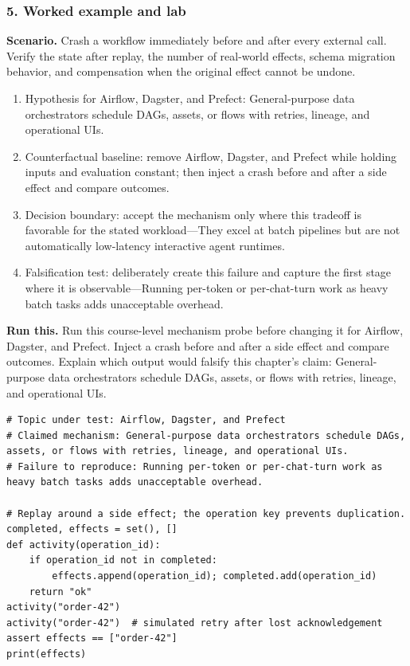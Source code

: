 \subsubsection*{5. Worked example and lab}
\textbf{Scenario.} Crash a workflow immediately before and after every external call. Verify the state after replay, the number of real-world effects, schema migration behavior, and compensation when the original effect cannot be undone.
\begin{enumerate}
\item Hypothesis for Airflow, Dagster, and Prefect: General-purpose data orchestrators schedule DAGs, assets, or flows with retries, lineage, and operational UIs.
\item Counterfactual baseline: remove Airflow, Dagster, and Prefect while holding inputs and evaluation constant; then inject a crash before and after a side effect and compare outcomes.
\item Decision boundary: accept the mechanism only where this tradeoff is favorable for the stated workload—They excel at batch pipelines but are not automatically low-latency interactive agent runtimes.
\item Falsification test: deliberately create this failure and capture the first stage where it is observable—Running per-token or per-chat-turn work as heavy batch tasks adds unacceptable overhead.
\end{enumerate}
\textbf{Run this.} Run this course-level mechanism probe before changing it for Airflow, Dagster, and Prefect. Inject a crash before and after a side effect and compare outcomes. Explain which output would falsify this chapter's claim: General-purpose data orchestrators schedule DAGs, assets, or flows with retries, lineage, and operational UIs.
\begin{Verbatim}[fontsize=\scriptsize]
# Topic under test: Airflow, Dagster, and Prefect
# Claimed mechanism: General-purpose data orchestrators schedule DAGs, assets, or flows with retries, lineage, and operational UIs.
# Failure to reproduce: Running per-token or per-chat-turn work as heavy batch tasks adds unacceptable overhead.

# Replay around a side effect; the operation key prevents duplication.
completed, effects = set(), []
def activity(operation_id):
    if operation_id not in completed:
        effects.append(operation_id); completed.add(operation_id)
    return "ok"
activity("order-42")
activity("order-42")  # simulated retry after lost acknowledgement
assert effects == ["order-42"]
print(effects)
\end{Verbatim}
